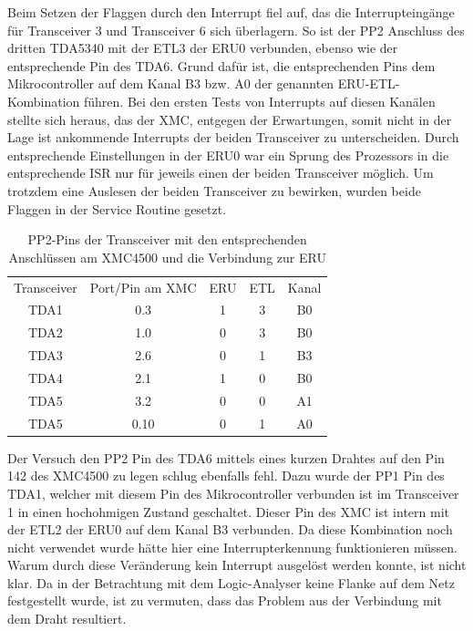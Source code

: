 Beim Setzen der Flaggen durch den Interrupt fiel auf, das die Interrupteingänge für Transceiver 3 und Transceiver 6 sich überlagern. So ist der PP2 Anschluss des dritten TDA5340 mit der \ac{ETL}3 der \ac{ERU}0 verbunden, ebenso wie der entsprechende Pin des TDA6. Grund dafür ist, die entsprechenden Pins dem Mikrocontroller auf dem Kanal B3 bzw. A0 der genannten \ac{ERU}-\ac{ETL}-Kombination führen. Bei den ersten Tests von Interrupts auf diesen Kanälen stellte sich heraus, das der XMC, entgegen der Erwartungen, somit nicht in der Lage ist ankommende Interrupts der beiden Transceiver zu unterscheiden. Durch entsprechende Einstellungen in der \ac{ERU}0 war ein Sprung des Prozessors in die entsprechende \acl{ISR} nur für jeweils einen der beiden Transceiver möglich. Um trotzdem eine Auslesen der beiden Transceiver zu bewirken, wurden beide Flaggen in der Service Routine gesetzt.
\begin{table}[h]
	\centering
\begin{tabular}{ccccc}
	Transceiver & Port/Pin am XMC & ERU & ETL & Kanal \\ 
	TDA1 & 0.3 & 1 & 3 & B0 \\ 
	TDA2 & 1.0 & 0 & 3 & B0 \\ 
	TDA3 & 2.6 & 0 & 1 & B3 \\ 
	TDA4 & 2.1 & 1 & 0 & B0 \\ 
	TDA5 & 3.2 & 0 & 0 & A1 \\ 
	TDA5 & 0.10 & 0 & 1 & A0 \\ 
\end{tabular} 
\caption{PP2-Pins der Transceiver mit den entsprechenden Anschlüssen am XMC4500 und die Verbindung zur ERU}
\label{tab:PP2ERU}
\end{table}
Der Versuch den PP2 Pin des TDA6 mittels eines kurzen Drahtes auf den Pin 142 des XMC4500 zu legen schlug ebenfalls fehl. Dazu wurde der PP1 Pin des TDA1, welcher mit diesem Pin des Mikrocontroller verbunden ist im Transceiver 1 in einen hochohmigen Zustand geschaltet. Dieser Pin des XMC ist intern mit der \ac{ETL}2 der \ac{ERU}0 auf dem Kanal B3 verbunden. Da diese Kombination noch nicht verwendet wurde hätte hier eine Interrupterkennung funktionieren müssen. Warum durch diese Veränderung kein Interrupt ausgelöst werden konnte, ist nicht klar. Da in der Betrachtung mit dem Logic-Analyser keine Flanke auf dem Netz festgestellt wurde, ist zu vermuten, dass das Problem aus der Verbindung mit dem Draht resultiert.




